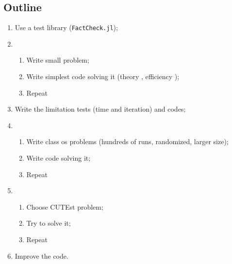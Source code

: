 

\subsection{Outline}

\begin{frame}[t,fragile]
  \begin{enumerate}
    \setlength{\itemsep}{0pt}
    \item<1-> Use a test library (\texttt{FactCheck.jl});
    \item<2->
    \begin{enumerate}
      \item Write small problem;
      \item Write simplest code solving it (theory \yes, efficiency \no);
      \item Repeat
    \end{enumerate}
    \item<3-> Write the limitation tests (time and iteration) and codes;
    \item<4->
    \begin{enumerate}
      \item Write class os problems (hundreds of runs, randomized, larger size);
      \item Write code solving it;
      \item Repeat
    \end{enumerate}
    \item<5->
    \begin{enumerate}
      \item Choose CUTEst problem;
      \item Try to solve it;
      \item Repeat
    \end{enumerate}
    \item<6-> Improve the code.
  \end{enumerate}
\end{frame}

